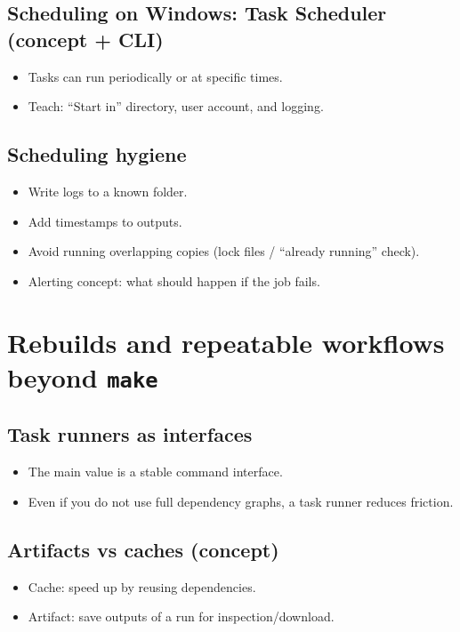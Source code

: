 \subsection{Scheduling on Windows: Task Scheduler (concept + CLI)}
\begin{itemize}
\item Tasks can run periodically or at specific times.
\item Teach: ``Start in'' directory, user account, and logging.
\end{itemize}

\subsection{Scheduling hygiene}
\begin{itemize}
\item Write logs to a known folder.
\item Add timestamps to outputs.
\item Avoid running overlapping copies (lock files / ``already running'' check).
\item Alerting concept: what should happen if the job fails.
\end{itemize}

\section{Rebuilds and repeatable workflows beyond \texttt{make}}
\subsection{Task runners as interfaces}
\begin{itemize}
\item The main value is a stable command interface.
\item Even if you do not use full dependency graphs, a task runner reduces friction.
\end{itemize}

\subsection{Artifacts vs caches (concept)}
\begin{itemize}
\item Cache: speed up by reusing dependencies.
\item Artifact: save outputs of a run for inspection/download.
\end{itemize}

